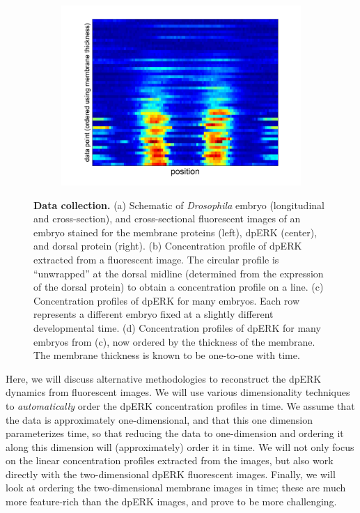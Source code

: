 \documentclass[10pt]{article}
\begin{document}
\begin{figure}[!ht]
\begin{center}
\begin{subfigure}{0.4\textwidth}
\includegraphics[width=\textwidth]{data_ordered_membrane}
\caption{}
\end{subfigure}
\end{center}
\caption{{\bf Data collection.} (a) Schematic of {\em Drosophila} embryo (longitudinal and cross-section), and cross-sectional fluorescent images of an embryo stained for the membrane proteins (left), dpERK (center), and dorsal protein (right).
(b) Concentration profile of dpERK extracted from a fluorescent image. The circular profile is ``unwrapped'' at the dorsal midline (determined from the expression of the dorsal protein) to obtain a concentration profile on a line.
(c) Concentration profiles of dpERK for many embryos. Each row represents a different embryo fixed at a slightly different developmental time.
(d) Concentration profiles of dpERK for many embryos from (c), now ordered by the thickness of the membrane. The membrane thickness is known to be one-to-one with time.}
\label{fig:background}
\end{figure}

Here,  we will discuss alternative methodologies to reconstruct the dpERK dynamics from fluorescent images. 
%
We will use various dimensionality techniques to {\em automatically} order the dpERK concentration profiles in time.
%
We assume that the data is approximately one-dimensional, and that this one dimension parameterizes time, so that reducing the data to one-dimension and ordering it along this dimension will (approximately) order it in time. 
%
We will not only focus on the linear concentration profiles extracted from the images, but also work directly with the two-dimensional dpERK fluorescent images. 
%
Finally, we will look at ordering the two-dimensional membrane images in time; these are much more feature-rich than the dpERK images, and prove to be more challenging.
\end{document}
